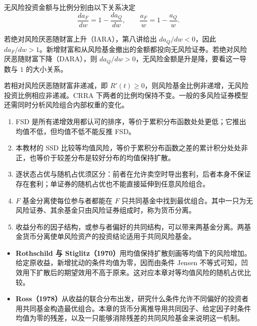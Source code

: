 无风险投资金额与比例分别由以下关系决定
\[
 \frac{da_F}{dw}=1-\frac{da_Q}{dw},\qquad
 \frac{a_F}{w}=1-\frac{a_Q}{w}.
\]

若绝对风险厌恶随财富上升（IARA），第八讲给出 $da_Q/dw<0$，因此 $da_F/dw>1$。新增财富和从风险基金撤出的金额都投向无风险证券。若绝对风险厌恶随财富下降（DARA），则 $da_Q/dw>0$，无风险金额是升是降，要看这一导数与 $1$ 的大小关系。

若相对风险厌恶随财富非递减，即 $R'(t)\ge0$，则风险基金比例非递增，无风险投资比例相应非递减。CRRA 下两者的比例均保持不变。一般的多风险证券模型还需同时分析风险组合内部权重的变化。

\WJChapterSummary
\begin{tcolorbox}[summary]
\begin{enumerate}
 \item FSD 是所有递增效用都认可的排序，等价于累积分布函数处处更低；它推出均值不低，但均值不低不能反推 FSD。
 \item 本教材的 SSD 比较等均值风险，等价于累积分布函数之差的累计积分处处非正，也等价于较差分布是较好分布的均值保持扩散。
 \item 逐状态占优与随机占优须区分：前者在允许卖空时导出套利，后者本身不保证存在套利；单证券的随机占优也不能直接延伸到任意风险组合。
 \item $F$ 基金分离使每位参与者都能在 $F$ 只共同基金中找到最优组合。其中一只为无风险证券、其余基金只由风险证券组成时，称为货币分离。
 \item 收益分布的因子结构，或参与者偏好的共同结构，可以带来两基金分离。两基金货币分离使单风险资产的投资结论适用于共同风险基金。
\end{enumerate}
\end{tcolorbox}

\begin{tcolorbox}[knowledge,breakable=false,title={参考文献与本章贡献}]
\begin{itemize}
 \item \textbf{Rothschild 与 Stiglitz（1970）}用均值保持扩散刻画等均值下的风险增加。给定原收益，新增扰动的条件均值为零，因而由条件 Jensen 不等式可知，凹效用下扩散后的期望效用不高于原来。这对应本章对等均值风险的随机占优比较。
 \item \textbf{Ross（1978）}从收益的联合分布出发，研究什么条件允许不同偏好的投资者用共同基金构造最优组合。本章的货币分离推导用共同因子、给定因子时条件均值为零的残差，以及一只能够消除残差的共同风险基金来说明这一机制。
\end{itemize}
\end{tcolorbox}

\fi

\WJChapterExercises

\endgroup
